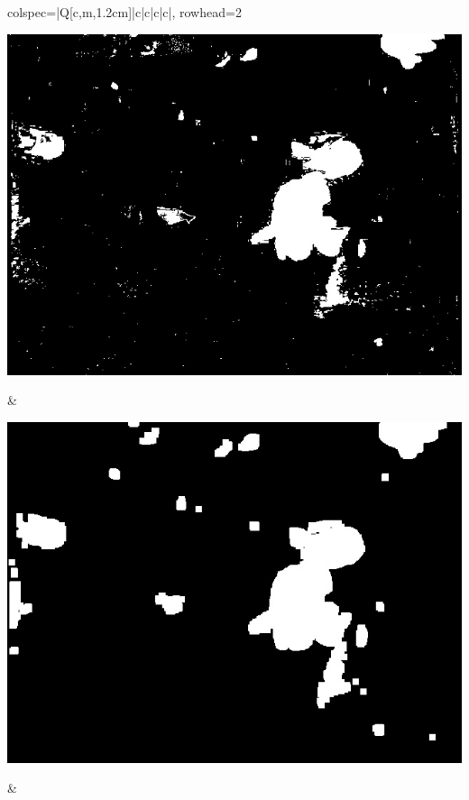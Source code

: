\begin{longtblr}[
            caption = {Hasil uji coba proses \textit{background subtraction} menggunakan GMM yang disempurnakan oleh Operasi Morfologi},
            label = {tab:gmm_morph_9908}
        ]{
            colspec={|Q[c,m,1.2cm]|c|c|c|c|},
            rowhead=2
        }
\begin{minipage}{0.19\textwidth}
                \includegraphics[width=\linewidth]{image/gt_124/gt_124_gmm_frame1173.jpg}
            \end{minipage} & 
            \begin{minipage}{0.19\textwidth}
                \includegraphics[width=\linewidth]{image/gt_124/gt_124_dilated_3x9_frame1173.jpg}
            \end{minipage} &
            \begin{minipage}{0.19\textwidth}

\end{minipage}
\end{longtblr}
